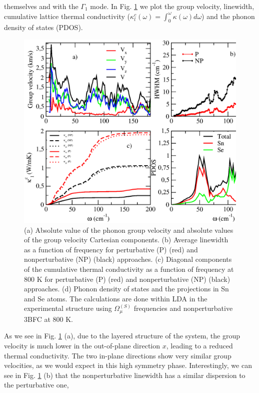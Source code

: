 themselves and with the $\Gamma_1$ mode. In Fig. \ref{thermal-analysis} we plot the group velocity, linewidth, cumulative lattice thermal conductivity
($\kappa_{l}^{c}(\omega)=\int_{0}^{\omega}\kappa(\omega)d\omega$) and the phonon density of states (PDOS).
\begin{figure}[th]
\includegraphics[width=\linewidth]{Figures/thermal_analysis.eps}
	\caption[Thermal propertie of $Cmcm$ SnSe.]{(a) Absolute value of the phonon group velocity and absolute 
	values of the group velocity Cartesian components. (b) Average linewidth as a function of frequency for 
	perturbative (P) (red) and nonperturbative (NP) (black) approaches. (c) Diagonal components of the 
	cumulative thermal conductivity as a function of frequency at $800$ K for perturbative (P) (red) and 
	nonperturbative (NP) (black) approaches. (d) Phonon density of states and the projections in Sn and Se atoms. 
	The calculations are done within LDA in the experimental structure using
$\Omega^{(S)}_{\mu}$ frequencies and nonperturbative 3BFC at $800$ K.}
\label{thermal-analysis}
\end{figure}
As we see in Fig. \ref{thermal-analysis} (a), due to the layered structure of the system, the group velocity is much
lower in the out-of-plane direction $x$, leading to a reduced thermal conductivity. The two in-plane directions show
very similar group velocities, as we would expect in this high symmetry phase. Interestingly, we can see in
Fig. \ref{thermal-analysis} (b) that the nonperturbative linewidth has a similar dispersion to the perturbative one,
